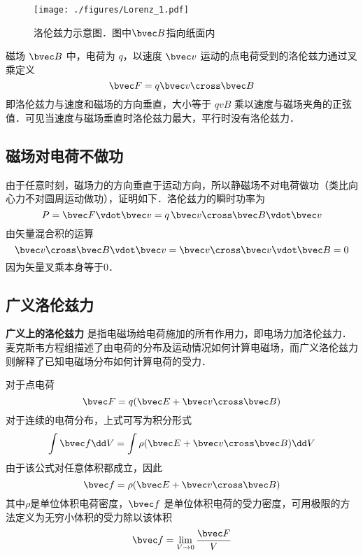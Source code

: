 
\begin{figure}[ht]
\centering
\texttt{[image: ./figures/Lorenz\_1.pdf]}
\caption{洛伦兹力示意图．图中$\bvec B$指向纸面内} \label{Lorenz_fig1}
\end{figure}
磁场 $\bvec B$ 中，电荷为 $q$，以速度 $\bvec v$ 运动的点电荷受到的洛伦兹力通过叉乘定义
\begin{equation}\label{Lorenz_eq1}
\bvec F = q\bvec v \cross \bvec B
\end{equation}
即洛伦兹力与速度和磁场的方向垂直，大小等于 $qvB$ 乘以速度与磁场夹角的正弦值．可见当速度与磁场垂直时洛伦兹力最大，平行时没有洛伦兹力．

\subsection{磁场对电荷不做功}
由于任意时刻，磁场力的方向垂直于运动方向，所以静磁场不对电荷做功（类比向心力不对圆周运动做功），证明如下．洛伦兹力的瞬时功率为
\begin{equation}
P = \bvec F \vdot \bvec v = q\,\bvec v \cross \bvec B \vdot \bvec v
\end{equation}
由矢量混合积的运算
\begin{equation}
\bvec v \cross \bvec B \vdot \bvec v = \bvec v \cross \bvec v \vdot \bvec B = 0
\end{equation}
因为矢量叉乘本身等于0．


\subsection{广义洛伦兹力}
\textbf{广义上的洛伦兹力} 是指电磁场给电荷施加的所有作用力，即电场力加洛伦兹力．麦克斯韦方程组描述了由电荷的分布及运动情况如何计算电磁场，而广义洛伦兹力则解释了已知电磁场分布如何计算电荷的受力．

对于点电荷
\begin{equation}\label{Lorenz_eq2}
\bvec F = q (\bvec E + \bvec v \cross \bvec B)
\end{equation}
对于连续的电荷分布，上式可写为积分形式
\begin{equation}
\int \bvec f \dd V= \int \rho(\bvec E + \bvec v \cross \bvec B) \dd V
\end{equation}
由于该公式对任意体积都成立，因此
\begin{equation}
\bvec f = \rho(\bvec E + \bvec v \cross \bvec B)
\end{equation}
其中$\rho$是单位体积电荷密度，$\bvec f$ 是单位体积电荷的受力密度，可用极限的方法定义为无穷小体积的受力除以该体积
\begin{equation}
\bvec f = \lim_{V \to 0} \frac{\bvec F}{V}
\end{equation}

